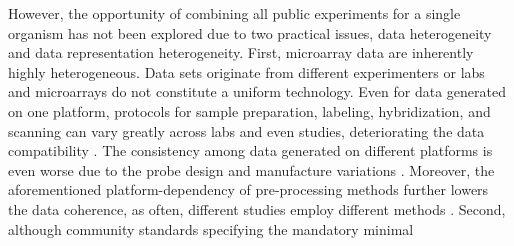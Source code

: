 %
However, the opportunity of combining all public experiments for a single
organism has not been explored due to two practical issues, data heterogeneity
and data representation heterogeneity.
%
First, microarray data are inherently highly heterogeneous.
%
Data sets originate from different experimenters or labs and microarrays do not
constitute a uniform technology.
%
Even for data generated on one platform, protocols for sample preparation,
labeling, hybridization, and scanning can vary greatly across labs and even
studies, deteriorating the data compatibility \cite{Bammler2005, Irizarry2005}.
%
The consistency among data generated on different platforms is even worse due to
the probe design and manufacture variations \cite{Sasik2004, Draghici2006}.
%
%
Moreover, the aforementioned platform-dependency of pre-processing methods
further lowers the data coherence, as often, different studies
employ different methods \cite{Irizarry2005, Shi2006, Stafford2007}.
%
%
%
Second, although community standards specifying the mandatory minimal
